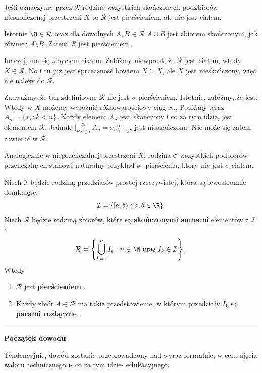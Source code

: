 \begin{eg}
	Jeśli oznaczymy przez $\mathcal{R}$ rodzinę wszystkich skończonych podzbiorów nieskończonej przestrzeni $X$ to $\mathcal{R}$ jest pierścieniem, ale nie jest ciałem.

	Istotnie $\O \in \mathcal{R}$ oraz dla dowolnych $A,B \in \mathcal{R}$ $A\cup B$ jest zbiorem skończonym, jak również $A\setminus B$. Zatem $\mathcal{R}$ jest pierścieniem. 
	
	Inaczej, ma się z byciem ciałem. Załóżmy niewprost, że $\mathcal{R}$ jest ciałem, wtedy $X\in \mathcal{R}$. No i tu już jest sprzeczność bowiem $X\subseteq X$, ale $X$ jest nieskończony, więć nie należy do $\mathcal{R}$.

	Zauważmy, że tak zdefiniowne $\mathcal{R}$ nie jest $\sigma$-pierścieniem. Istotnie, załóżmy, że jest. Wtedy w  $X$ możemy wyróżnić różnowarościowy ciąg $x_{n}$. Połóżmy teraz $A_{n}= \{x_{k}: k<n\} $. Każdy element $A_{n}$ jest skończony i co za tym idzie, jest elementem $\mathcal{R}$.
	Jednak $\bigcup_{i \in  I}^{\infty} A_{n} = {x_{n}}_{n=1}^{\infty}$, jest nieskończona. Nie może się zatem zawierać w $\mathcal{R}$.
	
	Analogicznie w nieprzeliczalnej przestrzeni $X$, rodzina $\mathcal{C}$ wszystkich podbiorów przeliczalnych stanowi naturalny przykład $\sigma$- pierścienia, który nie jest $\sigma$-ciałem.
\end{eg} 
\begin{theorem}
	Niech $\mathcal{I}$ będzie rodziną przedziałów prostej rzeczywistej, która są lewostronnie domknięte:
	\[
	\mathcal{I} = \{[a,b): a,b\in \R\} 
	.\] 
	Niech $\mathcal{R}$ będzie rodziną zbiorów, które są \textbf{skończonymi sumami} elementów z $\mathcal{I}$ :  
	\[
	\mathcal{R} = \left\{\bigcup_{k=1}^{n}I_{k}: n\in \N \text{ oraz }I_{k}\in \mathcal{I}\right\} 
	.\] 
	Wtedy 
	\begin{enumerate}[label=\arabic*.]
		\item $\mathcal{R}$  jest \textbf{pierścieniem} .
		\item Każdy zbiór $A\in \mathcal{R}$ ma takie przedstawienie, w którym przedziały $I_{k}$ są \textbf{parami rozłączne}. 
	\end{enumerate}
\end{theorem}
\vspace{1em}

\hrule

\textbf{Początek dowodu}

Tendencyjnie, dowód zostanie przeprowadzony nad wyraz formalnie, w celu ujęcia waloru technicznego i- co za tym idzie- edukacyjnego.


